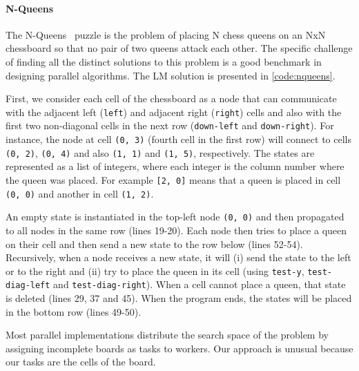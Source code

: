 
\paragraph{N-Queens}

The N-Queens~\cite{8queens} puzzle is the problem of placing N chess queens on an NxN chessboard so
that no pair of two queens attack each other. The specific challenge of finding all the distinct
solutions to this problem is a good benchmark in designing parallel algorithms. The LM solution is presented
in \ref{code:nqueens}.

First, we consider each cell of the chessboard as a node that can communicate with the adjacent left
(\texttt{left}) and adjacent right (\texttt{right}) cells and also with the first two non-diagonal cells in the next row
(\texttt{down-left} and \texttt{down-right}). For instance, the node at cell \texttt{(0,~3)} (fourth cell in the first row) will connect
to cells \texttt{(0,~2)}, \texttt{(0,~4)} and also \texttt{(1,~1)} and \texttt{(1,~5)}, respectively. The states are represented as a list
of integers, where each integer is the column number where the queen was placed. For example \texttt{[2, 0]}
means that a queen is placed in cell \texttt{(0,~0)} and another in cell \texttt{(1,~2)}.

An empty state is instantiated in the top-left node \texttt{(0,~0)} and then propagated to all nodes in the same row (lines 19-20).
Each node then tries to place a queen on their cell and then send a new state to the row below (lines 52-54).
Recursively, when a node receives a new state, it will (i) send the state to the left
or to the right and (ii) try to place the queen in its cell (using \texttt{test-y}, \texttt{test-diag-left} and \texttt{test-diag-right}). When a cell cannot place a queen, that state is deleted (lines 29, 37 and 45).
When the program ends, the states will be placed in the bottom row (lines 49-50).

Most parallel implementations distribute the search space of the problem by assigning incomplete boards as tasks to workers.
Our approach is unusual because our tasks are the cells of the board.